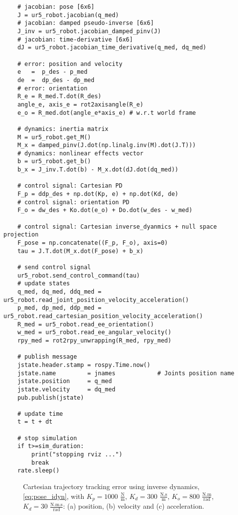 \begin{lstlisting}
    # jacobian: pose [6x6]
    J = ur5_robot.jacobian(q_med)  
    # jacobian: damped pseudo-inverse [6x6]
    J_inv = ur5_robot.jacobian_damped_pinv(J)   
    # jacobian: time-derivative [6x6]
    dJ = ur5_robot.jacobian_time_derivative(q_med, dq_med)

    # error: position and velocity
    e 	=  p_des - p_med
    de 	=  dp_des - dp_med    
    # error: orientation
    R_e = R_med.T.dot(R_des)
    angle_e, axis_e = rot2axisangle(R_e)
    e_o = R_med.dot(angle_e*axis_e) # w.r.t world frame

    # dynamics: inertia matrix
    M = ur5_robot.get_M()
    M_x = damped_pinv(J.dot(np.linalg.inv(M).dot(J.T)))
    # dynamics: nonlinear effects vector
    b = ur5_robot.get_b()
    b_x = J_inv.T.dot(b) - M_x.dot(dJ.dot(dq_med))

    # control signal: Cartesian PD
    F_p = ddp_des + np.dot(Kp, e) + np.dot(Kd, de)
    # control signal: orientation PD
    F_o = dw_des + Ko.dot(e_o) + Do.dot(w_des - w_med)
    
    # control signal: Cartesian inverse_dyanmics + null space projection
    F_pose = np.concatenate((F_p, F_o), axis=0)
    tau = J.T.dot(M_x.dot(F_pose) + b_x) 
    
    # send control signal
    ur5_robot.send_control_command(tau)
    # update states
    q_med, dq_med, ddq_med = ur5_robot.read_joint_position_velocity_acceleration()
    p_med, dp_med, ddp_med = ur5_robot.read_cartesian_position_velocity_acceleration()
    R_med = ur5_robot.read_ee_orientation()
    w_med = ur5_robot.read_ee_angular_velocity()
    rpy_med = rot2rpy_unwrapping(R_med, rpy_med)
    
    # publish message
    jstate.header.stamp = rospy.Time.now()
    jstate.name 		= jnames			# Joints position name
    jstate.position 	= q_med
    jstate.velocity 	= dq_med
    pub.publish(jstate)

    # update time
    t = t + dt
    
    # stop simulation
    if t>=sim_duration:
        print("stopping rviz ...")
        break
    rate.sleep()
\end{lstlisting}


\begin{figure}%
	\centering
	\caption{Cartesian trajectory tracking error using inverse dynamics, \eqref{eq:pose_idyn}, with  ${K_{p}}=1000$ $\mathrm{\frac{N}{m}}$, $K_{d}= 300$ $\mathrm{\frac{N.s}{m}}$, ${K_{o}}=800$ $\mathrm{\frac{N.m}{rad}}$, $K_{d}= 30$ $\mathrm{\frac{N.m.s}{rad}}$: (a) position, (b) velocity and (c) acceleration.}
	\label{fig:act_3.6_ee_position_error}
\end{figure}

